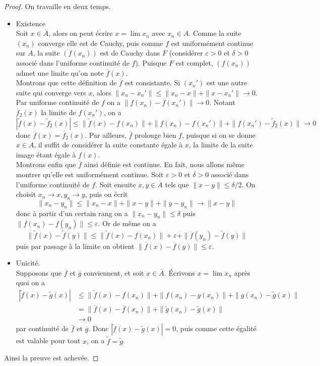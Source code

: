 \documentclass[french]{book}
\theoremstyle{plain}
\theoremstyle{definition}
\theoremstyle{remark}
\begin{document}
\begin{proof}
	On travaille en deux temps.
	\begin{itemize}
		\item Existence \\
		Soit $x \in \overline{A}$, alors on peut écrire $x = \lim x_n$ avec $x_n \in A$. Comme la suite $(x_n)$ converge elle est de Cauchy, puis comme $f$ est uniformément continue sur $A$, la suite $(f(x_n))$ est de Cauchy dans $F$ (considérer $\varepsilon > 0$ et $\delta > 0$ associé dans l'uniforme continuité de $f$). Puisque $F$ est complet, $(f(x_n))$ admet une limite qu'on note $\overline{f}(x)$. \\
		Montrons que cette définition de $\overline{f}$ est consistante. Si $(x_n')$ est une autre suite qui converge vers $x$, alors $\|x_n - x_n'\| \leqslant \|x_n - x\| + \|x - x_n'\| \rightarrow 0$. Par uniforme continuité de $f$ on a $\|f(x_n) - f(x_n')\| \rightarrow 0$. Notant $\overline{f}_2(x)$ la limite de $f(x_n')$, on a
		$$|\tilde{f}(x) - \tilde{f}_2(x)| \leqslant \|\tilde{f}(x) - f(x_n)\| + \|f(x_n) - f(x_n')\| + \|f(x_n') - \tilde{f}_2(x)\| \rightarrow 0$$
		donc $\overline{f}(x) = \overline{f}_2(x)$.
		Par ailleurs, $\overline{f}$ prolonge bien $f$, puisque si on se donne $x \in A$, il suffit de considérer la suite constante égale à $x$, la limite de la suite image étant égale à $f(x)$. \\
		Montrons enfin que $\overline{f}$ ainsi définie est continue. En fait, nous allons même montrer qu'elle est uniformément continue. Soit $\varepsilon > 0$ et $\delta > 0$ associé dans l'uniforme continuité de $f$. Soit ensuite $x, y \in \overline{A}$ tels que $\|x - y\| \leqslant \delta/2$. On choisit $x_n \rightarrow x, y_n \rightarrow y$, puis on écrit $$\|x_n - y_n\| \leqslant \|x_n - x\| + \|x - y\| + \|y - y_n\| \rightarrow \|x - y\|$$ donc à partir d'un certain rang on a $\|x_n - y_n\| \leqslant \delta$ puis $\|f(x_n) - f(y_n)\| \leqslant \varepsilon$. Or de même on a $$\|\tilde{f}(x) - \tilde{f}(y)\| \leqslant \|\tilde{f}(x) - f(x_n)\| + \varepsilon + \|f(y_n) - \tilde{f}(y)\|$$ puis par passage à la limite on obtient $\|\overline{f}(x) - \overline{f}(y)\| \leqslant \varepsilon$.
		\item Unicité. \\
		Supposons que $\overline{f}$ et $\overline{g}$ conviennent, et soit $x \in \overline{A}$. Écrivons $x = \lim x_n$ après quoi on a
		\begin{align*}
			|\tilde{f}(x) - \tilde{g}(x)| &\leqslant \|\tilde{f}(x) - f(x_n)\| + \|f(x_n) - g(x_n)\| + \|g(x_n) - \tilde{g}(x)\| \\ 
			&= \|\overline{f}(x) - \overline{f}(x_n)\| + \|\tilde{g}(x_n) - \tilde{g}(x)\|\\
			&\rightarrow 0
		\end{align*}
		par continuité de $\overline{f}$ et $\overline{g}$. Donc $|\tilde{f}(x) - \tilde{g}(x)| = 0$, puis comme cette égalité est valable pour tout $x$, on a $\tilde{f} = \tilde{g}$.
	\end{itemize}
Ainsi la preuve est achevée.
\end{proof}
\end{document}
